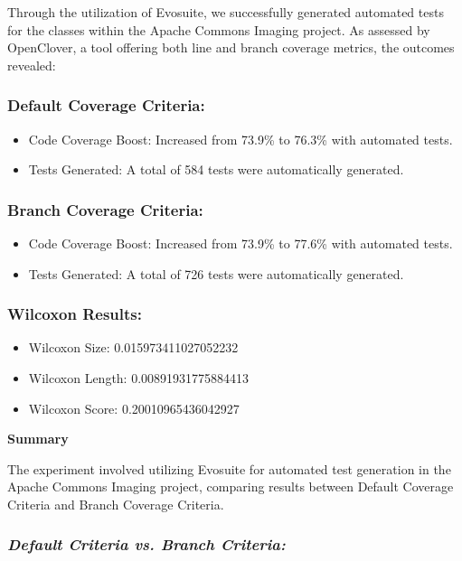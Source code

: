 \documentclass[sigconf]{acmart}
\begin{document}
Through the utilization of Evosuite, we successfully generated automated tests for the classes within the Apache Commons Imaging project. As assessed by OpenClover, a tool offering both line and branch coverage metrics, the outcomes revealed:

\subsubsection{\textbf{Default Coverage Criteria:}}

 \begin{itemize}
    \item Code Coverage Boost: Increased from 73.9\% to 76.3\% with automated tests.
    \item Tests Generated: A total of 584 tests were automatically generated.
 \end{itemize}

\subsubsection{\textbf{Branch Coverage Criteria:}}

 \begin{itemize}
    \item Code Coverage Boost: Increased from 73.9\% to 77.6\% with automated tests.
    \item Tests Generated: A total of 726 tests were automatically generated.
 \end{itemize}

\subsubsection{\textbf{Wilcoxon Results:}}

 \begin{itemize}
        \item Wilcoxon Size: 0.015973411027052232
        \item Wilcoxon Length: 0.00891931775884413
        \item Wilcoxon Score: 0.20010965436042927
 \end{itemize}

\textbf{Summary}

The experiment involved utilizing Evosuite for automated test generation in the Apache Commons Imaging project, comparing results between Default Coverage Criteria and Branch Coverage Criteria.

\subsubsection{\textit{Default Criteria vs. Branch Criteria:}}
\end{document}
